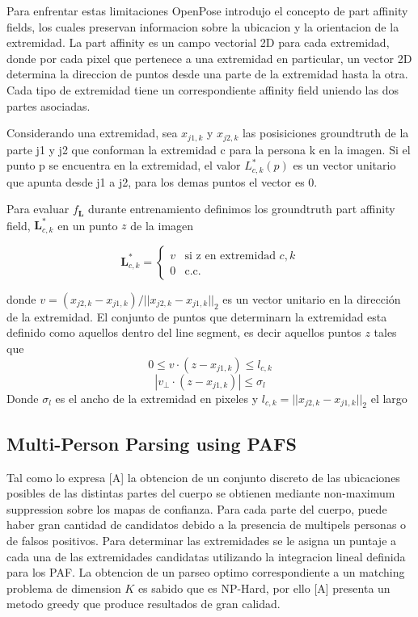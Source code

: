 \documentclass[runningheads]{llncs}
\begin{document}
Para enfrentar estas limitaciones OpenPose introdujo el concepto de part affinity fields, los cuales preservan informacion sobre la ubicacion y la orientacion de la extremidad. La part affinity es un campo vectorial 2D para cada extremidad, donde por cada pixel que pertenece a una extremidad en particular, un vector 2D determina la direccion de puntos desde una parte de la extremidad hasta la otra. Cada tipo de extremidad tiene un correspondiente affinity field uniendo las dos partes asociadas.

Considerando una extremidad, sea $x_{j1,k}$ y $x_{j2,k}$ las posisiciones groundtruth de la parte j1 y j2 que conforman la extremidad c para la persona k en la imagen. Si el punto p se encuentra en la extremidad, el valor $L^{*}_{c,k}(p)$ es un vector unitario que apunta desde j1 a j2, para los demas puntos el vector es 0.

Para evaluar $f_{\textbf{L}}$ durante entrenamiento definimos los groundtruth part affinity field, $\textbf{L}_{c,k}^*$ en un punto $z$ de la imagen

\begin{equation}
\textbf{L}_{c,k}^* = \begin{cases}
v &\text{si z en extremidad $c,k$}\\
0 &\text{c.c.}
\end{cases}
\end{equation}

donde $v = (x_{j2,k}-x_{j1,k})/||x_{j2,k}-x_{j1,k}||_2$ es un vector unitario en la dirección de la extremidad. El conjunto de puntos que determinarn la extremidad esta definido como aquellos dentro del line segment, es decir aquellos puntos $z$ tales que 
\begin{equation}
0 \le v \cdot (z - x_{j1,k}) \le l_{c,k}
\end{equation}
\begin{equation}
|v_{\perp} \cdot (z - x_{j1,k})| \le \sigma_{l}
\end{equation}
Donde $\sigma_{l}$ es el ancho de la extremidad en pixeles y $l_{c,k}=||x_{j2,k}-x_{j1,k}||_2$ el largo


\subsection{Multi-Person Parsing using PAFS}
Tal como lo expresa [A] la obtencion de un conjunto discreto de las ubicaciones posibles de las distintas partes del cuerpo se obtienen mediante non-maximum suppression sobre los mapas de confianza. Para cada parte del cuerpo, puede haber gran cantidad de candidatos debido a la presencia de multipels personas o de falsos positivos. Para determinar las extremidades se le asigna un puntaje a cada una de las extremidades candidatas utilizando la integracion lineal definida para los PAF. La obtencion de un parseo optimo correspondiente a un matching problema de dimension $\textit{K}$ es sabido que es NP-Hard, por ello [A] presenta un metodo greedy que produce resultados de gran calidad.
\end{document}
